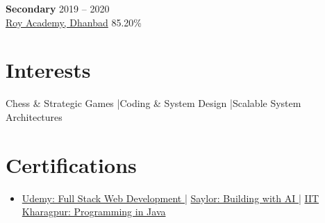 \documentclass[a4paper,10pt]{article}
\begin{document}
\textbf{Secondary} \hfill 2019 -- 2020 \\
\href{https://drive.google.com/file/d/16TLYYONeyLaemFxQTAiFGJXFBConsh8e/view?usp=sharing}{Roy Academy, Dhanbad} \hfill 85.20\%

\section*{Interests}
Chess \& Strategic Games \quad|\quad Coding \& System Design \quad|\quad Scalable System Architectures

\section*{Certifications}
\begin{itemize}
\item \href{https://udemy-certificate.s3.amazonaws.com/pdf/UC-53a9e3f1-cb41-4419-9419-d5271a67b741.pdf}{Udemy: Full Stack Web Development \quad |\quad} \href{https://learn.saylor.org/pluginfile.php/1/tool_certificate/issues/1763391491/0368517683MA.pdf}{Saylor: Building with AI \quad |\quad} \href{https://drive.google.com/file/d/1QZ_C8XfGIxVyAqLyvEtRDfPKWdStqbn-/view?usp=sharing}{IIT Kharagpur: Programming in Java}
\end{itemize}
\end{document}
